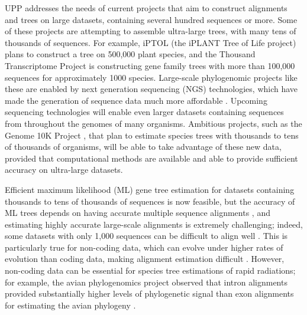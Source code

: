 UPP addresses the needs of current projects
that aim to construct alignments and trees on
large datasets, containing several hundred sequences or more.
Some of these projects are attempting to assemble
ultra-large trees, with many tens of thousands of sequences.
For example, 
iPTOL \cite{iptol} (the iPLANT Tree of Life 
project)
plans to construct a
tree on 500,000 plant species, and  
the Thousand Transcriptome Project \cite{1kp} is
constructing gene family trees with more
than 100,000 sequences for approximately 
1000 species.
Large-scale phylogenomic projects
like these
are enabled by next generation sequencing (NGS) technologies, 
which have made the generation of sequence data much
more affordable \cite{NGS}.
Upcoming sequencing technologies \cite{Mutz2013,KuRoukos2013}
will enable even 
larger datasets containing sequences from throughout
the genomes of many organisms.
Ambitious projects, such as the Genome 10K
Project \cite{Genome10k}, that plan to estimate
species trees with thousands to tens of thousands
of organisms, will be able to take advantage of
these new data, provided that computational methods
are available and able to provide sufficient accuracy
on ultra-large datasets.

Efficient maximum likelihood (ML) gene tree estimation for
datasets containing thousands \cite{Stamatakis2006} to tens of thousands
\cite{Price2010}  of
sequences is now feasible, but the accuracy of ML trees depends
on having accurate multiple sequence alignments \cite{Morrison2006}, and 
estimating highly accurate large-scale alignments 
is extremely challenging; indeed,
some datasets with only 1,000
sequences can be difficult to align well \cite{Liu2009,Liu2012}.
This is particularly true for non-coding data, which can 
evolve under higher rates of evolution than coding data,
making alignment estimation difficult
\cite{PrychitkoMoore2003}.
However, non-coding data can be essential
for species tree estimations of rapid radiations;
for example, the avian phylogenomics project
observed that intron alignments provided
substantially higher levels of phylogenetic
signal than exon alignments for estimating
the avian phylogeny \cite{StatisticalBinning,jarvis2014}.


